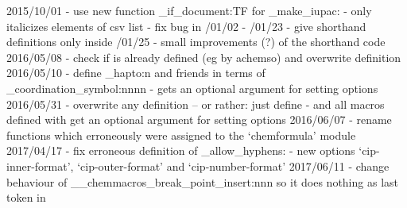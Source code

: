 2015/10/01 - use new function \chemmacros_if_document:TF for
             \chemmacros_make_iupac:
           - \cip only italicizes elements of csv list
           - fix bug in /01/02 - /01/23 - give shorthand definitions only inside /01/25 - small improvements (?) of the shorthand code
2016/05/08 - check if \latin is already defined (eg by achemso) and overwrite
             definition
2016/05/10 - define \chemmacros_hapto:n and friends in terms of
             \chemmacros_coordination_symbol:nnnn
           - \iupac gets an optional argument for setting options
2016/05/31 - overwrite any \latin definition -- or rather: just define \latin
           - \latin and all macros defined with \NewChemLatin get an optional
             argument for setting options
2016/06/07 - rename functions which erroneously were assigned to the
             `chemformula' module
2017/04/17 - fix erroneous definition of \chemmacros_allow_hyphens:
           - new options `cip-inner-format', `cip-outer-format' and
             `cip-number-format'
2017/06/11 - change behaviour of \__chemmacros_break_point_insert:nnn so
             it does nothing as last token in \iupac
